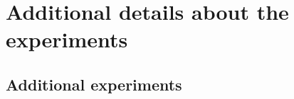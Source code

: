 \documentclass{article}
\begin{document}
\section{Additional details about the experiments}
\subsection{Additional experiments}
\end{document}
